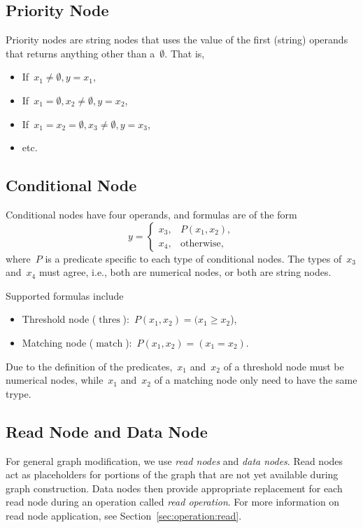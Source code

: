\documentclass{article}
\DeclareMathOperator{\thresholdNode}{thres}
\DeclareMathOperator{\matchingNode}{match}
\begin{document}
\subsection{Priority Node}

Priority nodes are string nodes that uses the value of the first (string) operands that returns anything other than a~$\emptyset$.
That is,

\begin{itemize}
  \item If~$x_1 \neq \emptyset, y = x_1$,
  \item If~$x_1 = \emptyset, x_2\neq\emptyset, y = x_2$,
  \item If~$x_1 = x_2 = \emptyset, x_3\neq\emptyset, y = x_3$,
  \item etc.
\end{itemize}

\subsection{Conditional Node}

Conditional nodes have four operands, and formulas are of the form
%
\begin{equation*}
  y = \begin{cases}
    x_3, & P(x_1, x_2),      \\
    x_4, & \text{otherwise},
  \end{cases}
\end{equation*}
%
where~$P$ is a predicate specific to each type of conditional nodes.
The types of~$x_3$ and~$x_4$ must agree, i.e., both are numerical nodes, or both are string nodes.

Supported formulas include
%
\begin{itemize}
  \item Threshold node ($\thresholdNode$):~$P(x_1, x_2) = (x_1 \ge x_2$),
  \item Matching node ($\matchingNode$):~$P(x_1, x_2) = (x_1 = x_2)$.
\end{itemize}
%
Due to the definition of the predicates,~$x_1$ and~$x_2$ of a threshold node must be numerical nodes, while~$x_1$ and~$x_2$ of a matching node only need to have the same trype.

\subsection{Read Node and Data Node}

For general graph modification, we use \emph{read nodes} and \emph{data nodes}.
Read nodes act as placeholders for portions of the graph that are not yet available during graph construction.
Data nodes then provide appropriate replacement for each read node during an operation called \emph{read operation}.
For more information on read node application, see Section~\ref{sec:operation:read}.
\end{document}
